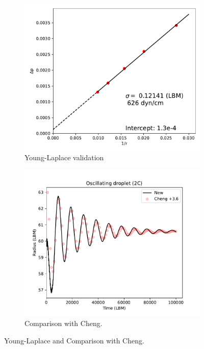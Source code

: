\documentclass[12pt]{article}
\begin{document}
		\begin{figure}[h]
		\centering
		\begin{subfigure}{.5\textwidth}
			\centering
			\includegraphics[width=1\linewidth]{pics/IFT.pdf}
			\caption{Young-Laplace validation}
		\end{subfigure}%
		\begin{subfigure}{.5\textwidth}
			\centering
			\includegraphics[width=1\linewidth]{pics/2cOsc.pdf}
			\caption{Comparison with Cheng.}
		\end{subfigure}
		\caption{Young-Laplace and Comparison with Cheng.}
		\label{fig:laplace}
	\end{figure}
	
\end{document}
